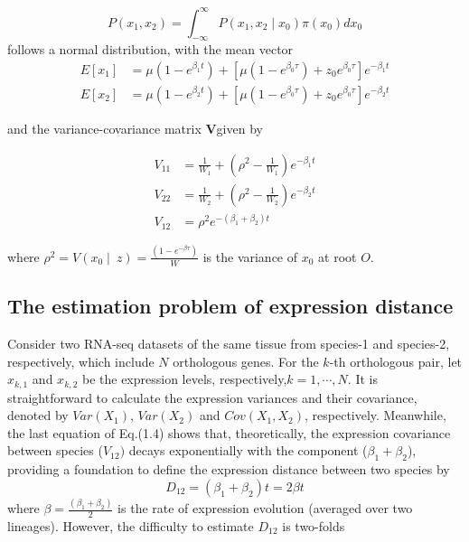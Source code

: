 \documentclass[]{book}
\begin{document}
\[P\left(x_1,x_2\right)=\int_{-\infty}^{\infty}P\left(x_1,x_2\mid x_0\right)\pi\left(x_0\right)dx_0\tag{1.2}\]
follows a normal distribution, with the mean vector
\[
\begin{split}
E\left[x_1\right]&=\mu\left(1-e^{\beta_1t}\right)+\left[\mu\left(1-e^{\beta_0\tau}\right)+z_0e^{\beta_0\tau}\right]e^{-\beta_1t} \\
E\left[x_2\right]&=\mu\left(1-e^{\beta_2t}\right)+\left[\mu\left(1-e^{\beta_0\tau}\right)+z_0e^{\beta_0\tau}\right]e^{-\beta_2t} 
\end{split}\tag{1.3}
\]

and the variance-covariance matrix \(\boldsymbol{V}\)given by

\[
\begin{split}
V_{11}&=\frac{1}{W_1}+\left(\rho^2-\frac{1}{W_1}\right)e^{-\beta_1t}\\
V_{22}&=\frac{1}{W_2}+\left(\rho^2-\frac{1}{W_2}\right)e^{-\beta_2t}\\
V_{12}&=\rho^2e^{-\left(\beta_1+\beta_2\right)t}
\end{split}
\tag{1.4}
\]

where \(\rho^2=V\left(x_0\mid\  z\right)=\frac{\left(1-e^{-\beta\tau}\right)}{W}\) is the variance of \(x_0\) at root \(O\).

\hypertarget{the-estimation-problem-of-expression-distance}{%
\subsection{The estimation problem of expression distance}\label{the-estimation-problem-of-expression-distance}}

Consider two RNA-seq datasets of the same tissue from species-1 and species-2, respectively, which include \(N\) orthologous genes. For the \(k\)-th orthologous pair, let \(x_{k,1}\) and \(x_{k,2}\) be the expression levels, respectively,\(k=1,\cdots,N\). It is straightforward to calculate the expression variances and their covariance, denoted by \(Var(X_1)\), \(Var(X_2)\) and \(Cov(X_1, X_2)\), respectively. Meanwhile, the last equation of Eq.(1.4) shows that, theoretically, the expression covariance between species (\(V_{12})\) decays exponentially with the component (\(\beta_1+\beta_2\)), providing a foundation to define the expression distance between two species by
\[D_{12}=\left(\beta_1+\beta_2\right)t=2\beta t\tag{1.5}\]
where \(\beta=\frac{\left(\beta_1+\beta_2\right)}{2}\) is the rate of expression evolution (averaged over two lineages). However, the difficulty to estimate \(D_{12}\) is two-folds
\end{document}
